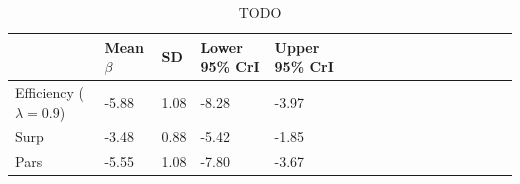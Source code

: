 \documentclass[10pt,twoside,lineno]{article}
\begin{document}
\begin{table}
\small{
\begin{center}
\begin{tabular}{|l||l|lll|llll|ll|llllll}
\hline
	& Mean $\beta$ & SD & Lower 95\% CrI & Upper 95\% CrI \\
\hline\hline
	Efficiency ($\lambda=0.9$) &	-5.88   &   1.08  &  -8.28  &  -3.97  \\
	Surp & -3.48   &   0.88  &  -5.42  &  -1.85   \\
	Pars & -5.55   &   1.08  &  -7.80  &  -3.67    \\
\hline
\end{tabular}
\end{center}
}
	\caption{TODO}\label{tab:study1}
\end{table}
\end{document}
